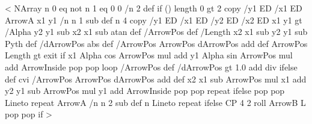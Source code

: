 %
%
\def\begin@ClosedObj{%
    \leavevmode
    \pst@killglue
    \begingroup
	\use@par
	\solid@star
	\ifpsdoubleline \pst@setdoublesep \fi
	\pst@addarrowdef%
	\init@pscode
}
%
%
%
<{%
  NArray n 0 eq not { n 1 eq { 0 0 /n 2 def } if
  (\psk@ArrowInside) length 0 gt {
    2 copy /y1 ED /x1 ED ArrowA x1 y1
    /n n 1 sub def
    n {
      4 copy
      /y1 ED /x1 ED /y2 ED /x2 ED
      x1 y1
      \psk@ArrowInsidePos{} gt {
        /Alpha y2 y1 sub x2 x1 sub atan def
        /ArrowPos \psk@ArrowInsideOffset\space def
        /Length x2 x1 sub y2 y1 sub Pyth def
        /dArrowPos \psk@ArrowInsidePos\space abs def
        {
          /ArrowPos ArrowPos dArrowPos add def
          ArrowPos Length gt { exit } if
          x1 Alpha cos ArrowPos mul add
          y1 Alpha sin ArrowPos mul add
          ArrowInside
          pop pop
        } loop
      }{
        /ArrowPos \psk@ArrowInsideOffset\space def
        /dArrowPos  gt {%
          1.0  add div
        }{\psk@ArrowInsidePos } ifelse def
          \psk@ArrowInsideNo\space cvi {
            /ArrowPos ArrowPos dArrowPos add def
            x2 x1 sub ArrowPos mul x1 add
            y2 y1 sub ArrowPos mul y1 add
            ArrowInside
            pop pop
          } repeat
      } ifelse
      pop pop Lineto
    } repeat
  }{ ArrowA /n n 2 sub def n { Lineto } repeat } ifelse
  CP 4 2 roll ArrowB L pop pop } if%
}>
%
